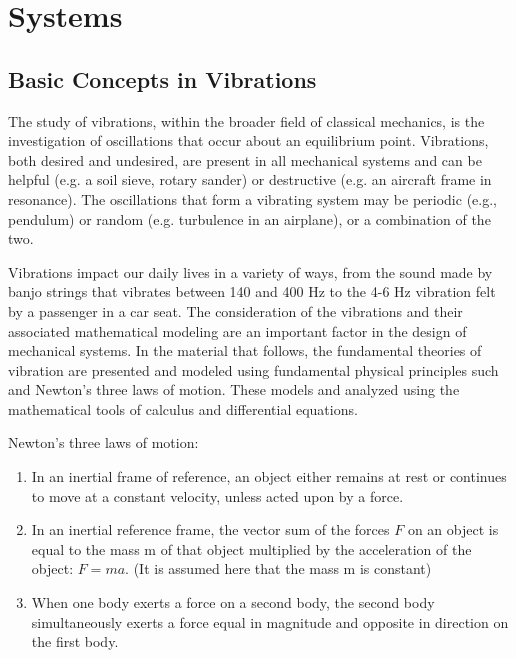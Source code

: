 \documentclass[12pt,letter]{article}
\begin{document}
	
	\setcounter{section}{1}	
	\setcounter{figure}{0}   
	\renewcommand\thefigure{\thesection.\arabic{figure}}


\section{Systems}

	\subsection{Basic Concepts in Vibrations}

    The study of vibrations, within the broader field of classical mechanics, is the investigation of oscillations that occur about an equilibrium point. Vibrations, both desired and undesired, are present in all mechanical systems and can be helpful (e.g. a soil sieve, rotary sander) or destructive (e.g. an aircraft frame in resonance). The oscillations that form a vibrating system may be periodic (e.g., pendulum) or random (e.g. turbulence in an airplane), or a combination of the two. 

    Vibrations impact our daily lives in a variety of ways, from the sound made by banjo strings that vibrates between 140 and 400 Hz to the 4-6 Hz vibration felt by a passenger in a car seat. The consideration of the vibrations and their associated mathematical modeling are an important factor in the design of mechanical systems. In the material that follows, the fundamental theories of vibration are presented and modeled using fundamental physical principles such and Newton's three laws of motion. These models and analyzed using the mathematical tools of calculus and differential equations. 

	\begin{review}
		Newton's three laws of motion:
		\begin{enumerate}
			\item In an inertial frame of reference, an object either remains at rest or continues to move at a constant velocity, unless acted upon by a force.
			\item In an inertial reference frame, the vector sum of the forces $F$ on an object is equal to the mass m of that object multiplied by the acceleration of the object: $F = ma$. (It is assumed here that the mass m is constant)
			\item When one body exerts a force on a second body, the second body simultaneously exerts a force equal in magnitude and opposite in direction on the first body.
		\end{enumerate}
	\end{review}
\end{document}
